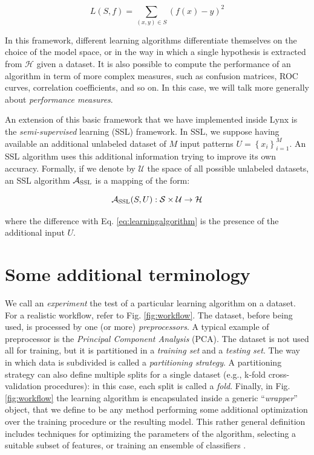 \[
L(S, f) = \sum_{(x,y) \in S}(f(x) - y)^2
\]

\noindent In this framework, different learning algorithms differentiate themselves on the choice of the model space, or in the way in which a single hypothesis is extracted from $\mathcal{H}$ given a dataset. It is also possible to compute the performance of an algorithm in term of more complex measures, such as confusion matrices, ROC curves, correlation coefficients, and so on. In this case, we will talk more generally about \textit{performance measures}.

An extension of this basic framework that we have implemented inside Lynx is the \textit{semi-supervised} learning (SSL) framework.\cite{chapelle2006semi} In SSL, we suppose having available an additional unlabeled dataset of $M$ input patterns $U = \left\{ x_i \right\}_{i=1}^M$. An SSL algorithm uses this additional information trying to improve its own accuracy. Formally, if we denote by $\mathcal{U}$ the space of all possible unlabeled datasets, an SSL algorithm $\mathcal{A}_{\mbox{\scriptsize SSL}}$ is a mapping of the form:

\begin{equation}
\mathcal{A}_{\mbox{\scriptsize SSL}}(S,U): \mathcal{S} \times \mathcal{U} \rightarrow \mathcal{H}
\label{eq:ssl}
\end{equation}

\noindent where the difference with Eq. \eqref{eq:learningalgorithm} is the presence of the additional input $U$.

\section{Some additional terminology}

We call an \textit{experiment} the test of a particular learning algorithm on a dataset. For a realistic workflow, refer to Fig. \ref{fig:workflow}. The dataset, before being used, is processed by one (or more) \textit{preprocessors}. A typical example of preprocessor is the \textit{Principal Component Analysis} (PCA). The dataset is not used all for training, but it is partitioned in a \textit{training set} and a \textit{testing set}. The way in which data is subdivided is called a \textit{partitioning strategy}. A partitioning strategy can also define multiple splits for a single dataset (e.g., k-fold cross-validation procedures): in this case, each split is called a \textit{fold}. Finally, in Fig. \ref{fig:workflow} the learning algorithm is encapsulated inside a generic ``\textit{wrapper}'' object, that we define to be any method performing some additional optimization over the training procedure or the resulting model. This rather general definition includes techniques for optimizing the parameters of the algorithm, selecting a suitable subset of features, or training an ensemble of classifiers \cite{alpaydin2004introduction}.

